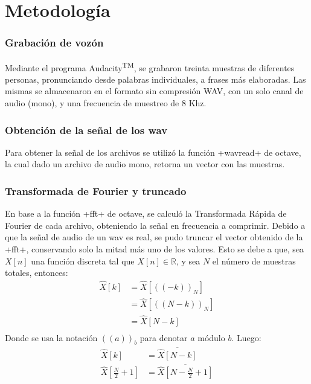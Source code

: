\documentclass[a4paper,11pt]{article}
\begin{document}
\section{Metodolog\'ia}

\subsubsection{Grabación de voz\'on}
Mediante el programa Audacity\textsuperscript{TM}, se grabaron treinta muestras
de diferentes personas, pronunciando desde palabras individuales, a frases más
elaboradas. Las mismas se almacenaron en el formato sin compresión WAV, con un
solo canal de audio (mono), y una frecuencia de muestreo de $8$ Khz.
\subsubsection{Obtención de la señal de los wav}
Para obtener la señal de los archivos se utilizó la función \verbatim+wavread+ de octave,
la cual dado un archivo de audio mono, retorna un vector con las muestras.
\subsubsection{Transformada de Fourier y truncado}
En base a la función \verbatim+fft+ de octave, se calculó la Transformada Rápida de
Fourier de cada archivo, obteniendo la señal en frecuencia a comprimir.
Debido a que la señal de audio de un wav es real, se pudo truncar el vector
obtenido de la \verbatim+fft+, conservando solo la mitad más uno de los valores. Esto se
debe a que, sea $X[n]$ una función discreta tal que $X[n] \in
\mathbb{R}$, y sea $N$ el número de muestras totales, entonces:
\begin{equation} \label{eq1}
    \begin{split}
        \hat{X}[k] & = \hat{X}[((-k))_N] \\
         & = \hat{X}[((N - k))_N] \\
         & = \hat{X}[N-k] \\
     \end{split}
\end{equation}
Donde se usa la notación $((a))_b$ para denotar $a$ módulo $b$.
Luego:
\begin{equation} \label{eq2}
    \begin{split}
        \hat{X}[k] & = \overline{\hat{X}[N-k]} \\
        \hat{X}[\frac{N}{2}+1] & = \overline{\hat{X}[N-\frac{N}{2}+1]} \\
     \end{split}
\end{equation}
\end{document}
